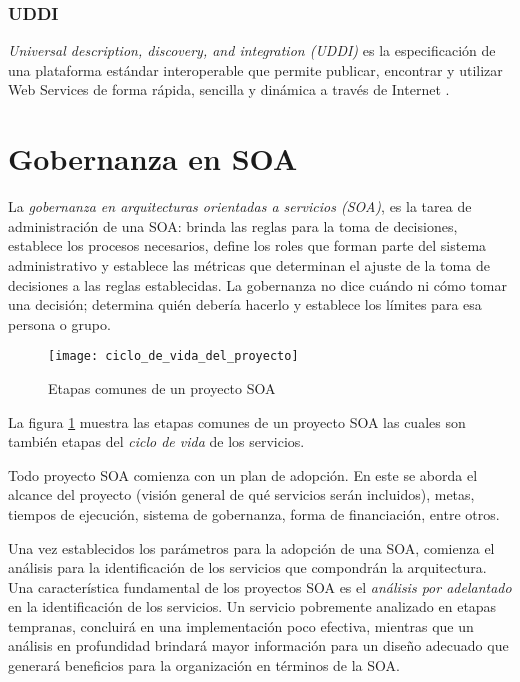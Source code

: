 \subsubsection{UDDI}
\label{MarcoConceptual:UDDI}
\emph{Universal description, discovery, and integration (UDDI)} es la especificación de una
plataforma estándar interoperable que permite publicar, encontrar y utilizar Web Services
de forma rápida, sencilla y dinámica a través de Internet \cite{UDDI:def}.

\section{Gobernanza en SOA}
  \label{MarcoConceptual:GobernanzaSOA}

  La \emph{gobernanza en arquitecturas orientadas a servicios (SOA)}, es la tarea de administración de una SOA: brinda las reglas para la toma de decisiones, establece los procesos necesarios, define los roles que forman parte del sistema administrativo y establece las métricas que determinan el ajuste de la toma de decisiones a las reglas establecidas. La gobernanza no dice cuándo ni cómo tomar una decisión; determina quién debería hacerlo y establece los límites para esa persona o grupo. \cite{Erl:2011:SGG:1983453}

  \begin{figure}[h]
    \centering
    \texttt{[image: ciclo\_de\_vida\_del\_proyecto]}
    \caption{Etapas comunes de un proyecto SOA}
    \label{figura:ciclo_de_vida_del_proyecto}
  \end{figure}

  La figura \ref{figura:ciclo_de_vida_del_proyecto} muestra las etapas comunes de un proyecto SOA las cuales son también etapas del \emph{ciclo de vida} de los servicios.

  Todo proyecto SOA comienza con un plan de adopción. En este se aborda el alcance del proyecto (visión general de qué servicios serán incluidos), metas, tiempos de ejecución, sistema de gobernanza, forma de financiación, entre otros.

  Una vez establecidos los parámetros para la adopción de una SOA, comienza el análisis para la identificación de los servicios que compondrán la arquitectura. Una característica fundamental de los proyectos SOA es el \emph{análisis por adelantado} en la identificación de los servicios. Un servicio pobremente analizado en etapas tempranas, concluirá en una implementación poco efectiva, mientras que un análisis en profundidad brindará mayor información para un diseño adecuado que generará beneficios para la organización en términos de la SOA.

